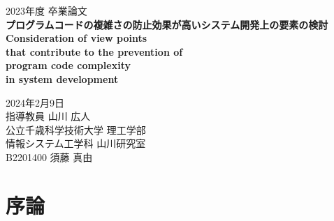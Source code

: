 \documentclass[12pt, a4paper]{jreport}
\begin{document}
    \thispagestyle{empty}
    \begin{center}

        \vspace{20mm}
        {\Large\noindent 2023年度 卒業論文}\\
        \vspace{40mm}
        {\huge\noindent\textbf{プログラムコードの複雑さの防止効果が高いシステム開発上の要素の検討}}\\
        \medskip
        \vspace{\baselineskip}
        {\LARGE\noindent\textbf{Consideration of view points}}\\
        \medskip
        {\LARGE\noindent\textbf{that contribute to the prevention of}}\\
        \medskip
        {\LARGE\noindent\textbf{program code complexity}}\\
        \medskip
        {\LARGE\noindent\textbf{in system development}}\\
        \vspace{40mm}

        {\Large\noindent
        2024年2月9日\\
        \vspace{\baselineskip}
        指導教員 山川 広人   \\
        \vspace{\baselineskip}
        公立千歳科学技術大学 理工学部\\
        情報システム工学科 山川研究室\\
        \vspace{\baselineskip}
        B2201400 須藤 真由 \\
        }
        \vspace{40mm}

    \end{center}
    \tableofcontents
    \chapter{序論}
\end{document}

